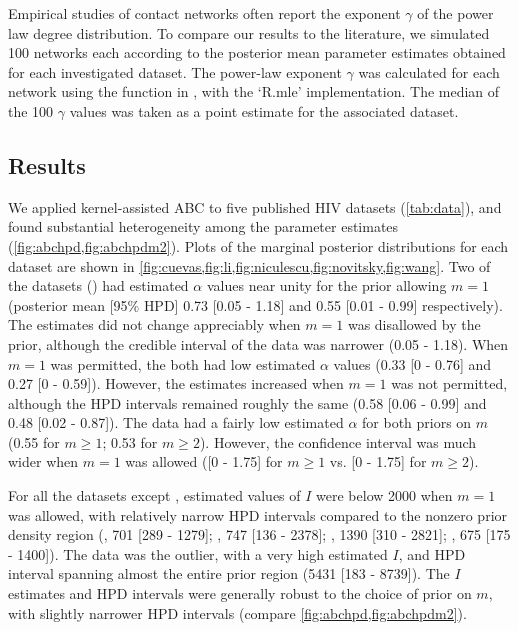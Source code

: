 Empirical studies of contact networks often report the exponent $\gamma$ of the
power law degree distribution. To compare our results to the literature, we
simulated 100 networks each according to the posterior mean parameter estimates
obtained for each investigated dataset. The power-law exponent $\gamma$ was
calculated for each network using the  function in
, with the `R.mle' implementation. The median of the 100
$\gamma$ values was taken as a point estimate for the associated dataset.

\subsection{Results}



We applied kernel-assisted ABC to five published HIV datasets (\cref{tab:data}),
and found substantial heterogeneity among the parameter estimates
(\cref{fig:abchpd,fig:abchpdm2}). Plots of the marginal posterior distributions
for each dataset are shown in
\cref{fig:cuevas,fig:li,fig:niculescu,fig:novitsky,fig:wang}.
Two of the datasets (\textcite{niculescu2015recent, wang2015targeting}) had
estimated $\alpha$ values near unity for the prior allowing $m = 1$ (posterior
mean [95\% \gls{HPD}] 
  0.73 
  [0.05 - 
   1.18]
and
  0.55 
  [0.01 -
   0.99] respectively).
The estimates did not change appreciably when $m = 1$ was disallowed by the
prior, although the credible interval of the \textcite{niculescu2015recent}
data was narrower
  (0.05 - 
   1.18).
When $m = 1$ was permitted, the \textcite{li2015hiv, cuevas2009hiv} both had
low estimated $\alpha$ values
  (0.33 
  [0 - 
  0.76]
and
  0.27 
  [0 -
   0.59]). 
However, the estimates increased when $m = 1$ was not permitted, although the
HPD intervals remained roughly the same
  (0.58 
  [0.06 - 
  0.99]
and
  0.48 
  [0.02 -
   0.87]).
The \textcite{novitsky2014impact} data had a fairly low estimated $\alpha$
for both priors on $m$
  (0.55 for $m \geq 1$;
   0.53 for $m \geq 2$).
However, the confidence interval was much wider when $m = 1$ was allowed
  ([0 -
    1.75] for $m \geq 1$ vs.
   [0 -
    1.75] for $m \geq 2$).

For all the datasets except \citeauthor{novitsky2014impact}, estimated values
of $I$ were below 2000 when $m = 1$ was allowed, with relatively narrow HPD
intervals compared to the nonzero prior density region
  (\citeauthor{cuevas2009hiv}, 701 
  [289 -
   1279];
   \citeauthor{niculescu2015recent}, 747
  [136 - 
   2378];
  \citeauthor{li2015hiv}, 1390 
  [310 -
   2821];
   \citeauthor{wang2015targeting}, 675
  [175 - 
   1400]).
The \citeauthor{novitsky2014impact} data was the outlier, with a very high
estimated $I$, and HPD interval spanning almost the entire prior region
  (5431 
  [183 -
   8739]).
The $I$ estimates and HPD intervals were generally robust to the choice of
prior on $m$, with slightly narrower HPD intervals (compare
\cref{fig:abchpd,fig:abchpdm2}).

